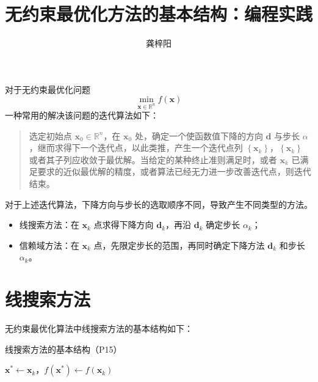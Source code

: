 \documentclass[cn]{elegantpaper}
\title{无约束最优化方法的基本结构：编程实践}
\author{龚梓阳}
\date{\zhtoday}
\begin{document}
\maketitle

对于无约束最优化问题
\begin{equation}
    \min_{\mathbf{x}\in\mathbb{R}^{n}}f\left(\mathbf{x}\right)
\end{equation}
一种常用的解决该问题的迭代算法如下：
\begin{quotation}
    选定初始点 $\mathbf{x}_{0}\in\mathbb{R}^{n}$，在 $\mathbf{x}_{0}$ 处，确定一个使函数值下降的方向 $\mathbf{d}$ 与步长 $\alpha$，继而求得下一个迭代点，以此类推，产生一个迭代点列 $\left\{\mathbf{x}_{k}\right\}$，$\left\{\mathbf{x}_{k}\right\}$ 或者其子列应收敛于最优解。当给定的某种终止准则满足时，或者 $\mathbf{x}_{k}$ 已满足要求的近似最优解的精度，或者算法已经无力进一步改善迭代点，则迭代结束。
\end{quotation}
\begin{remark}
    对于上述迭代算法，下降方向与步长的选取顺序不同，导致产生不同类型的方法。
    \begin{itemize}
        \item 线搜索方法：在 $\mathbf{x}_{k}$ 点求得下降方向 $\mathbf{d}_{k}$，再沿 $\mathbf{d}_{k}$ 确定步长 $\alpha_{k}$；
        \item 信赖域方法：在 $\mathbf{x}_{k}$ 点，先限定步长的范围，再同时确定下降方法 $\mathbf{d}_{k}$ 和步长 $\alpha_{k}$。
    \end{itemize}
\end{remark}

\section{线搜索方法}

无约束最优化算法中线搜索方法的基本结构如下：

\begin{algorithm}[H]
    \caption{线搜索方法的基本结构（P15）}
    $\mathbf{x}^{*}\leftarrow\mathbf{x}_{k}$，$f\left(\mathbf{x}^{*}\right)\leftarrow f\left(\mathbf{x}_{k}\right)$\;
\end{algorithm}
\end{document}
